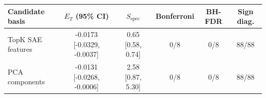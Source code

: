 \begin{tabular}{lccccc}
\toprule
Candidate basis & $E_T$ (95\% CI) & $S_{\mathrm{spec}}$ & Bonferroni & BH-FDR & Sign diag. \\
\midrule
TopK SAE features & -0.0173 [-0.0329, -0.0037] & 0.65 [0.58, 0.74] & 0/8 & 0/8 & 88/88 \\
PCA components & -0.0131 [-0.0268, -0.0006] & 2.58 [0.87, 5.30] & 0/8 & 0/8 & 88/88 \\
\bottomrule
\end{tabular}
